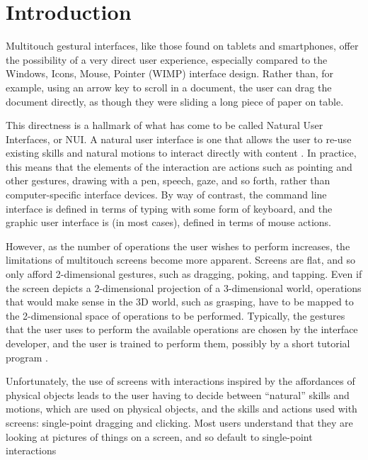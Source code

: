 \documentclass[]{article}
\title{}
\author{}
\begin{document}
\maketitle

\begin{abstract}

\end{abstract}

\section{Introduction}

Multitouch gestural interfaces, like those found on tablets and smartphones, offer the possibility of a very direct user experience, especially compared to the Windows, Icons, Mouse, Pointer (WIMP) interface design. 
Rather than, for example, using an arrow key to scroll in a document, the user can drag the document directly, as though they were sliding a long piece of paper on table. 

This directness is a hallmark of what has come to be called Natural User Interfaces, or NUI. 
A natural user interface is one that allows the user to re-use existing skills and natural motions to interact directly with content \cite{blakeNUIWin}. 
In practice, this means that the elements of the interaction are actions such as pointing and other gestures, drawing with a pen, speech, gaze, and so forth, rather than computer-specific interface devices. 
By way of contrast, the command line interface is defined in terms of typing with some form of keyboard, and the graphic user interface is (in most cases), defined in terms of mouse actions. 

However, as the number of operations the user wishes to perform increases, the limitations of multitouch screens become more apparent. 
Screens are flat, and so only afford 2-dimensional gestures, such as dragging, poking, and tapping. 
Even if the screen depicts a 2-dimensional projection of a 3-dimensional world, operations that would make sense in the 3D world, such as grasping, have to be mapped to the 2-dimensional space of operations to be performed. 
Typically, the gestures that the user uses to perform the available operations are chosen by the interface developer, and the user is trained to perform them, possibly by a short tutorial program \cite{wobbrock2009user, vanacken2008ghosts, freeman2009shadowguides}. 

Unfortunately, the use of screens with interactions inspired by the affordances of physical objects leads to the user having to decide between ``natural'' skills and motions, which are used on physical objects, and the skills and actions used with screens: single-point dragging and clicking. 
Most users understand that they are looking at pictures of things on a screen, and so default to single-point interactions \cite{vanacken2008ghosts}
\end{document}
